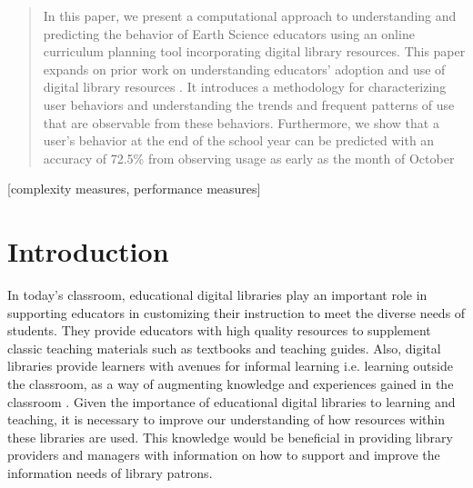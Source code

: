 \documentclass{acm_proc_article-sp}
\begin{document}

\maketitle
\begin{abstract}
In this paper, we present a computational approach to understanding and predicting the behavior of Earth Science educators using an online curriculum planning tool incorporating digital library resources. This paper expands on prior work on understanding educators' adoption and use of digital library resources \cite{maullunderstanding}. It introduces a methodology for characterizing user behaviors and understanding the trends and frequent patterns of use that are observable from these behaviors. Furthermore, we show that a user's behavior at the end of the school year can be predicted with an accuracy of 72.5\% from observing usage as early as the month of October
\end{abstract}

[complexity measures, performance measures]



\section{Introduction}
In today's classroom, educational digital libraries play an important role in supporting educators in customizing their instruction to meet the diverse needs of students\cite{sumner:team}. 
They provide educators with high quality resources to supplement classic teaching materials such as textbooks and teaching guides. Also, digital libraries provide learners with avenues for informal learning i.e. learning outside the classroom, as a way of augmenting knowledge and experiences gained in the classroom \cite{marchionini}. Given the importance of educational digital libraries to learning and teaching, it is necessary to improve our understanding of how resources within these libraries are used.  This knowledge would be beneficial in providing library providers and managers with information on how to support and improve the information needs of library patrons.
\end{document}
